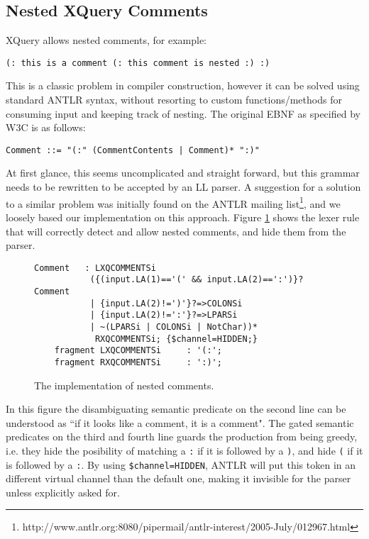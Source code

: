 \subsection{Nested XQuery Comments}
XQuery allows nested comments, for example:
\begin{Verbatim}
(: this is a comment (: this comment is nested :) :)
\end{Verbatim}
This is a classic problem in compiler construction, however it can be solved using standard ANTLR syntax, without resorting to custom functions/methods for consuming input and keeping track of nesting. The original EBNF as specified by W3C is as follows:
\begin{Verbatim}
Comment ::= "(:" (CommentContents | Comment)* ":)"
\end{Verbatim}
At first glance, this seems uncomplicated and straight forward, but this
grammar needs to be rewritten to be accepted by an LL parser. A suggestion for a solution to a similar problem was initially found on the ANTLR mailing list\footnote{http://www.antlr.org:8080/pipermail/antlr-interest/2005-July/012967.html}, and we loosely based our implementation on this approach. Figure \ref{fig:nestedComment} shows the lexer rule that will correctly detect and allow nested comments, and hide them from the parser.
\begin{figure}[h!]
\begin{Verbatim}
Comment   : LXQCOMMENTSi 
           ({(input.LA(1)=='(' && input.LA(2)==':')}?Comment 
           | {input.LA(2)!=')'}?=>COLONSi
           | {input.LA(2)!=':'}?=>LPARSi
           | ~(LPARSi | COLONSi | NotChar))*
            RXQCOMMENTSi; {$channel=HIDDEN;}
    fragment LXQCOMMENTSi     : '(:';
    fragment RXQCOMMENTSi     : ':)';
\end{Verbatim}
\label{fig:nestedComment}
\caption[The implementation of nested comments]{The implementation of nested comments.}
\end{figure}

In this figure the disambiguating semantic predicate on the second line can be understood as ``if it looks like a comment, it is a comment". The gated semantic predicates on the third and fourth line guards the production from being greedy, i.e. they hide the posibility of matching a \verb!:! if it is followed by a \verb!)!, and hide \verb!(! if it is followed by a \verb!:!. By using \verb!$channel=HIDDEN!, ANTLR will put this token in an different virtual channel than the default one, making it invisible for the parser unless explicitly asked for. 

